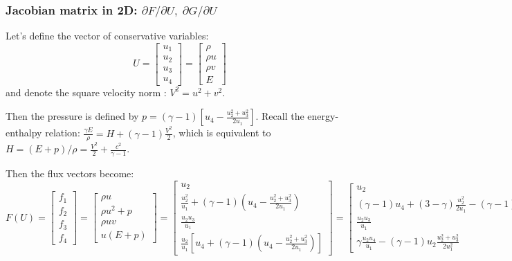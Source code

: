 \documentclass{article}
\begin{document}
\subsubsection*{Jacobian matrix in 2D: \boldmath $\partial F/\partial U, \; \partial G/\partial U$}

Let's define the vector of conservative variables:
\begin{equation}
  U = \left[
    \begin{array}{c}
      u_1\\
      u_2\\
      u_3\\
      u_4
    \end{array}
  \right] = \left[
    \begin{array}{c}
      \rho\\
      \rho u\\
      \rho v\\
      E
    \end{array}
  \right]
\end{equation}
and denote the square velocity norm : $V^2=u^2+v^2$.

Then the pressure is defined by $p=(\gamma-1)[u_4-\frac{u_2^2+u_3^2}{2u_1} ]$.
Recall the energy-enthalpy relation: $\frac{\gamma E}{\rho} = H+(\gamma-1)\frac{V^2}{2}$, which is equivalent to $H = (E+p)/\rho = \frac{V^2}{2}+\frac{c^2}{\gamma-1}$.

Then the flux vectors become:
\begin{equation}
  F(U) = \left[
    \begin{array}{c}
      f_1 \\
      f_2 \\
      f_3 \\
      f_4
    \end{array}
  \right] = \left[
    \begin{array}{c}
      \rho u\\
      \rho u^2 + p\\
      \rho u v\\
      u(E+p)
    \end{array}
  \right] = \left[
    \begin{array}{c}
      u_2\\
      \frac{u_2^2}{u_1} + (\gamma-1) (u_4-\frac{u_2^2+u_3^2}{2u_1})\\
      \frac{u_2 u_3}{u_1}\\
      \frac{u_2}{u_1} [ u_4 + (\gamma-1)(u_4-\frac{u_2^2+u_3^2}{2u_1}) ]
    \end{array}
  \right] = \left[
    \begin{array}{c}
      u_2\\
      (\gamma-1)u_4 + (3-\gamma)\frac{u_2^2}{2u_1} - (\gamma-1)\frac{u_3^2}{2u_1}\\
      \frac{u_2 u_3}{u_1}\\
      \gamma \frac{u_2 u_4}{u_1} - (\gamma-1) u_2 \frac{u_2^2+u_3^2}{2 u_1^2}
    \end{array}
  \right]
\end{equation}
\end{document}
